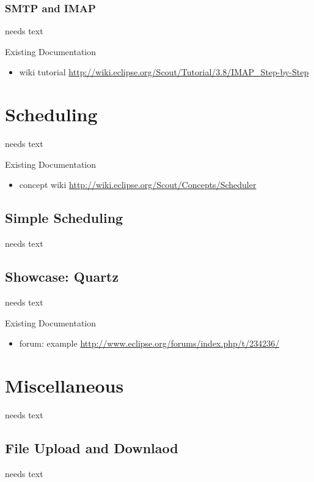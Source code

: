 \documentclass[a4paper,10pt,twoside]{book}
\begin{document}
\subsection{SMTP and IMAP}
needs text

\noindent Existing Documentation
\begin{itemize}
  \item wiki tutorial \url{http://wiki.eclipse.org/Scout/Tutorial/3.8/IMAP_Step-by-Step}
  \end{itemize}

\chapter{Scheduling}
needs text

\noindent Existing Documentation
\begin{itemize}
  \item concept wiki \url{http://wiki.eclipse.org/Scout/Concepts/Scheduler}
\end{itemize}

\section{Simple Scheduling}
needs text

\section{Showcase: Quartz}
needs text

\noindent Existing Documentation
\begin{itemize}
  \item forum: example \url{http://www.eclipse.org/forums/index.php/t/234236/}
\end{itemize}

\chapter{Miscellaneous}
needs text

\section{File Upload and Downlaod}
needs text
\end{document}
